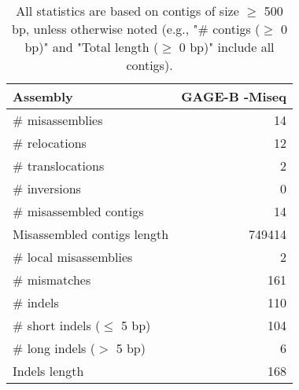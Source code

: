 \documentclass[12pt,a4paper]{article}
\begin{document}
\begin{table}[ht]
\begin{center}
\caption{All statistics are based on contigs of size $\geq$ 500 bp, unless otherwise noted (e.g., "\# contigs ($\geq$ 0 bp)" and "Total length ($\geq$ 0 bp)" include all contigs).}
\begin{tabular}{|l*{1}{|r}|}
\hline
Assembly & GAGE-B -Miseq \\ \hline
\# misassemblies & 14 \\ \hline
\hspace{5mm}\# relocations & 12 \\ \hline
\hspace{5mm}\# translocations & 2 \\ \hline
\hspace{5mm}\# inversions & 0 \\ \hline
\# misassembled contigs & 14 \\ \hline
Misassembled contigs length & 749414 \\ \hline
\# local misassemblies & 2 \\ \hline
\# mismatches & 161 \\ \hline
\# indels & 110 \\ \hline
\hspace{5mm}\# short indels ($\leq$ 5 bp) & 104 \\ \hline
\hspace{5mm}\# long indels ($>$ 5 bp) & 6 \\ \hline
Indels length & 168 \\ \hline
\end{tabular}
\end{center}
\end{table}
\end{document}
